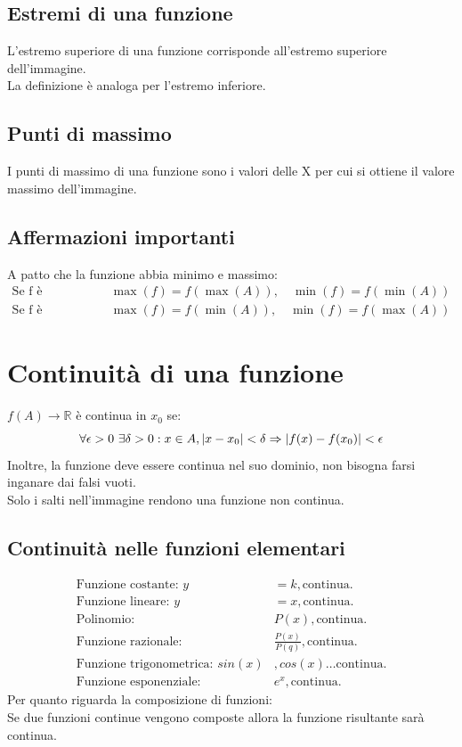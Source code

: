 \documentclass[12pt,a4paper]{article}
\let\oldsection\section
\renewcommand{\section}{\clearpage\oldsection}
\begin{document}
\subsection{Estremi di una funzione}
L'estremo superiore di una funzione corrisponde all'estremo superiore dell'immagine.\\
La definizione è analoga per l'estremo inferiore.

\subsection{Punti di massimo}
I punti di massimo di una funzione sono i valori delle X per cui si ottiene il valore massimo dell'immagine.

\subsection{Affermazioni importanti}
A patto che la funzione abbia minimo e massimo:
\begin{align*}
\text{Se f è debolmente crescente: } & \max(f)=f(\max(A)), \quad \min(f)=f(\min(A)) \\
\text{Se f è debolmente decrescente: } & \max(f)=f(\min(A)), \quad \min(f)=f(\max(A))
\end{align*}

\section{Continuità di una funzione}
$f(A)\to \mathbb{R}$ è continua in $x_0$ se:
\[
\forall \epsilon >0 \ \exists \delta >0 : x\in A, |x-x_0|<\delta \Rightarrow |f(x)-f(x_0)|<\epsilon\\
\]
Inoltre, la funzione deve essere continua nel suo dominio, non bisogna farsi inganare dai falsi vuoti.\\
Solo i salti nell'immagine rendono una funzione non continua.

\subsection{Continuità nelle funzioni elementari}
\begin{align*}
    \text{Funzione costante: } y &= k , \text{continua.}\\
    \text{Funzione lineare: } y &= x , \text{continua.}\\
    \text{Polinomio: } &P(x) , \text{continua.}\\
    \text{Funzione razionale: } &\frac{P(x)}{P(q)} , \text{continua.}\\
    \text{Funzione trigonometrica: } sin(x)&,cos(x)\ldots \text{continua.}\\
    \text{Funzione esponenziale: } &e^x , \text{continua.} 
\end{align*}
Per quanto riguarda la composizione di funzioni:\\
Se due funzioni continue vengono composte allora la funzione risultante sarà continua.
\end{document}
